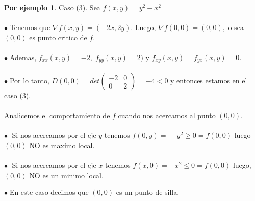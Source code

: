 \documentclass{article}
\theoremstyle{definition}
\theoremstyle{definition}
\newtheorem*{ej}{Por ejemplo}
\theoremstyle{remark}
\newcommand\bl{$\bullet\;$}
\begin{document}
\begin{ej} Caso \textcolor{rojop2}{(3)}. Sea $f(x,y)=y^2-x^2$\\\\
  \bl Tenemos que $\nabla f(x,y)=(-2x,2y)$. Luego, $\nabla f (0,0)=(0,0),$ o sea $(0,0)$ es punto critico de $f$. \\\\
   \bl Ademas, $f_{xx}(x,y)=-2, \; f_{yy}(x,y)=2)$ \; y \; $f_{xy}(x,y)=f_{yx}(x,y)=0$. \\\\
   \bl Por lo tanto, $D(0,0)=det\left(\begin{array}{rl}
       -2 & 0 \\
       0 & 2
   \end{array}\right)=-4<0$ y entonces estamos en el caso \textcolor{rojop2}{(3)}. \\\\
   Analicemos el comportamiento de $f$ cuando nos acercamos al punto $(0,0)$.\\\\
   \textcolor{verdep2}{\bl} Si nos acercamos por el eje $y$ tenemos $f(0,y)=\phantom{-}y^2\geq0=f(0,0)$ luego $(0,0)$ \underline{NO} es maximo local.\\\\
   \textcolor{rojop2}{\bl} Si nos acercamos por el eje $x$ tenemos $f(x,0)=-x^2\leq0=f(0,0)$ luego, $(0,0)$ \underline{NO} es un minimo local.
\end{ej}
  \begin{figure}[h]
\centering
\def\svgwidth{0.55\textwidth}
\makebox[\textwidth]{
}
\end{figure} 
\bl En este caso decimos que $(0,0)$ es un punto de silla.
\end{document}

